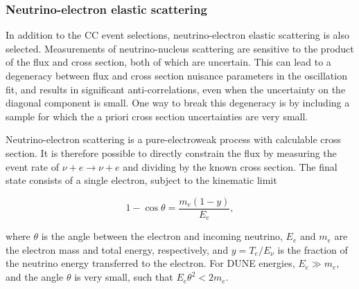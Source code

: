 \subsubsection{Neutrino-electron elastic scattering}



In addition to the CC event selections, neutrino-electron elastic scattering is also selected. Measurements of neutrino-nucleus scattering are sensitive to the product of the flux and cross section, both of which are uncertain. This can lead to a degeneracy between flux and cross section nuisance parameters in the oscillation fit, and results in significant anti-correlations, even when the uncertainty on the diagonal component is small. One way to break this degeneracy is by including a sample for which the a priori cross section uncertainties are very small. 

Neutrino-electron scattering is a pure-electroweak process with calculable cross section. It is therefore possible to directly constrain the flux by measuring the event rate of $\nu+ e \rightarrow \nu +e$ and dividing by the known cross section. The final state consists of a single electron, subject to the kinematic limit 

\begin{equation}
1 - \cos \theta = \frac{m_{e}(1-y)}{E_{e}},
\end{equation}

where $\theta$ is the angle between the electron and incoming neutrino, $E_{e}$ and $m_{e}$ are the electron mass and total energy, respectively, and $y = T_{e}/E_{\nu}$ is the fraction of the neutrino energy transferred to the electron. For DUNE energies, $E_{e} \gg m_{e}$, and the angle $\theta$ is very small, such that $E_{e}\theta^{2} < 2m_{e}$.

